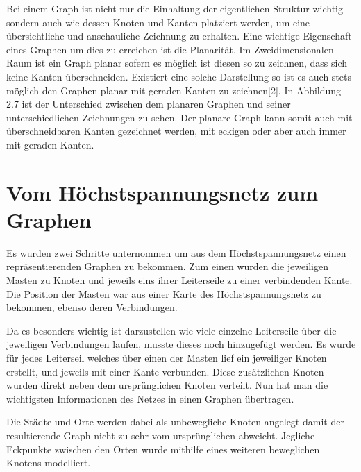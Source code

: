 Bei einem Graph ist nicht nur die Einhaltung der eigentlichen Struktur wichtig sondern auch wie dessen Knoten und Kanten platziert werden, um eine übersichtliche und anschauliche Zeichnung zu erhalten. Eine wichtige Eigenschaft eines Graphen um dies zu erreichen ist die Planarität. Im Zweidimensionalen Raum ist ein Graph planar sofern es möglich ist diesen so zu zeichnen, dass sich keine Kanten überschneiden. Existiert eine solche Darstellung so ist es auch stets möglich den Graphen planar mit geraden Kanten zu zeichnen[2]. In Abbildung 2.7 ist der Unterschied zwischen dem planaren Graphen und seiner unterschiedlichen Zeichnungen zu sehen. Der planare Graph kann somit auch mit überschneidbaren Kanten gezeichnet werden, mit eckigen oder aber auch immer mit geraden Kanten.


\section{Vom Höchstspannungsnetz zum Graphen}
\label{Vom Höchstspannungsnetz zum Graphen}
%

Es wurden zwei Schritte unternommen um aus dem Höchstspannungsnetz einen repräsentierenden Graphen zu bekommen. Zum einen wurden die jeweiligen Masten zu Knoten und jeweils eins ihrer Leiterseile zu einer verbindenden Kante. Die Position der Masten war aus einer Karte des Höchstspannungsnetz zu bekommen, ebenso deren Verbindungen. 

Da es besonders wichtig ist darzustellen wie viele einzelne Leiterseile über die jeweiligen Verbindungen laufen, musste dieses noch hinzugefügt werden. Es wurde für jedes Leiterseil welches über einen der Masten lief ein jeweiliger Knoten erstellt, und jeweils mit einer Kante verbunden. Diese zusätzlichen Knoten wurden direkt neben dem ursprünglichen Knoten verteilt. Nun hat man die wichtigsten Informationen des Netzes in einen Graphen übertragen.

Die Städte und Orte werden dabei als unbewegliche Knoten angelegt damit der resultierende Graph nicht zu sehr vom ursprünglichen abweicht. Jegliche Eckpunkte zwischen den Orten wurde mithilfe eines weiteren beweglichen Knotens modelliert.

